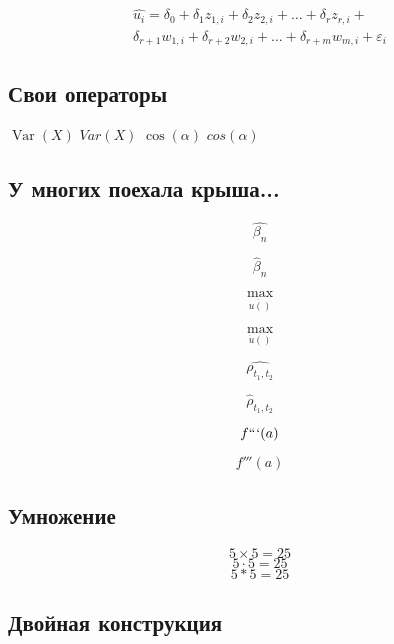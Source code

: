 \documentclass[12pt, a4paper]{article}
\DeclareMathOperator{\Var}{Var}
\begin{document}
\vspace{5mm}

  \begin{multline}
\hat{u_i} =\delta_0+\delta_1 z_{1,i} + \delta_2 z_{2,i}+ \ldots + \delta_r z_{r,i}+ \\
 \delta_{r+1} w_{1,i} + \delta_{r+2} w_{2,i} + \ldots + \delta_{r+m} w_{m,i} +\varepsilon_i  
 \tag{æææææ}
  \end{multline} 


\subsection{Свои операторы} 


$\Var(X)$  \hspace{5mm} $Var(X)$ \hspace{5mm} $\cos(\alpha)$  \hspace{5mm} $cos(\alpha)$

\subsection{У многих поехала крыша...}

\[ \hat{\beta_n} \]

\[ \hat{\beta}_n \]


\def \b{\hat{\beta}}

\[ \underset{\dot{ u()} }{\max} \]

\[ \underset{\dot{u}() }{\max} \]


\[ \hat{\rho_{t_1,t_2}} \]

\[ \hat\rho_{t_1,t_2} \]


\[ f```(a) \] 

\[ f'''(a) \] 

\subsection{Умножение} 

\[ 5 \times 5 = 25 \] 
\[ 5 \cdot 5 = 25 \] 
\[ 5 * 5 = 25 \] 

\subsection{Двойная конструкция}
\end{document}
